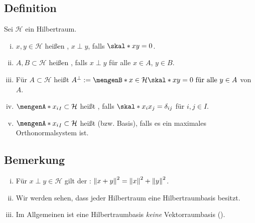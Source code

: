 \subsection[Definition: Orthogonal, Orthonormalsystem und Hilbertraumbasis]{Definition} %
\label{sub:713}
Sei $\mathcal{H}$ ein Hilbertraum.
\begin{enumerate}[(i)]
	\item $x,y \in \mathcal{H}$ heißen , $x\perp y$, falls $\skal*{x}{y}=0$.
	\item $A,B  \subset \mathcal{H}$ heißen , falls $x \perp y$ für alle $x \in A$, $y \in B$. 
	\item Für $A \subset \mathcal{H}$ heißt $A^\bot := \set[x \in \mathcal{H}]{\skal*{x}{y}=0 \text{ für alle } y \in A}$  von $A$.
	\item $\set{x_i}_{I} \subset \mathcal{H}$ heißt , falls $\skal*{x_i}{x_j}= \delta_{ij}$ für $i,j \in I$.
	\item $\set{x_i}_{I} \subset \mathcal{H}$ heißt  (bzw. Basis), falls es ein maximales Orthonormalsystem ist. 
\end{enumerate}

\subsection[Bemerkung: Satz von Pythagoras, Vergleich Hilbertraumbasis mit Vektorbasis]{Bemerkung} %
\label{sub:714}
\begin{enumerate}[(i)]
	\item Für $x \perp y \in \mathcal{H}$ gilt der : $\norm{x+y}^2 = \norm{x}^2  + \norm{y}^2$.
	\item Wir werden sehen, dass jeder Hilbertraum eine Hilbertraumbasis besitzt.
	\item Im Allgemeinen ist eine Hilbertraumbasis \emph{keine} Vektorraumbasis ().
\end{enumerate}

